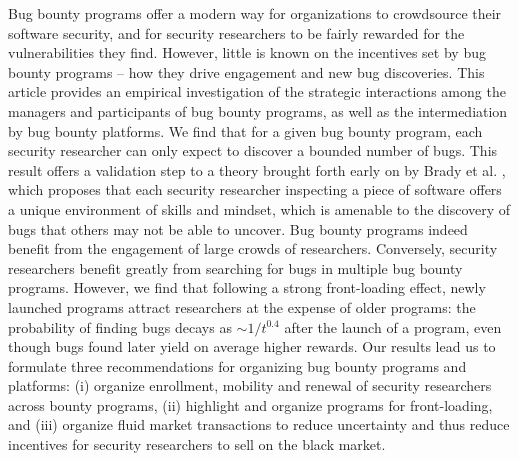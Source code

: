 Bug bounty programs offer a modern way for organizations to crowdsource their software security, and for security researchers to be fairly rewarded for the vulnerabilities they find. However, little is known on the incentives set by bug bounty programs -- how they drive engagement and new bug discoveries. This article provides an empirical investigation of the strategic interactions among the managers and participants of bug bounty programs, as well as the intermediation by bug bounty platforms. We find that for a given bug bounty program, each security researcher can only expect to discover a bounded number of bugs. This result offers a validation step to a theory brought forth early on by Brady et al. \cite{brady1999murphy}, which proposes that each security researcher inspecting a piece of software offers a unique environment of skills and mindset, which is amenable to the discovery of bugs that others may not be able to uncover. Bug bounty programs indeed benefit from the engagement of large crowds of researchers. Conversely, security researchers benefit greatly from searching for bugs in multiple bug bounty programs. However, we find that following a strong front-loading effect, newly launched programs attract researchers at the expense of older programs: the probability of finding bugs decays as $\sim 1/t^{0.4}$ after the launch of a program, even though bugs found later yield on average higher rewards. Our results lead us to formulate three recommendations for organizing bug bounty programs and platforms: (i) organize enrollment, mobility and renewal of security researchers across bounty programs, (ii) highlight and organize programs for front-loading, and (iii) organize fluid market transactions to reduce uncertainty and thus reduce incentives for security researchers to sell on the black market.



